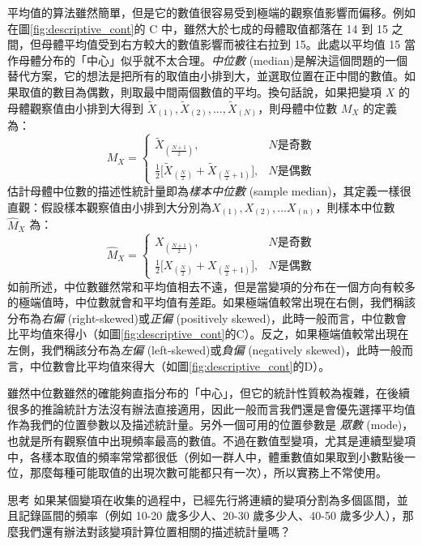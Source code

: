     平均值的算法雖然簡單，但是它的數值很容易受到極端的觀察值影響而偏移。例如在圖\ref{fig:descriptive_cont}的 C 中，雖然大於七成的母體取值都落在 14 到 15 之間，但母體平均值受到右方較大的數值影響而被往右拉到 15。此處以平均值 15 當作母體分布的「中心」似乎就不太合理。\textit{中位數} (median)是解決這個問題的一個替代方案，它的想法是把所有的取值由小排到大，並選取位置在正中間的數值。如果取值的數目為偶數，則取最中間兩個數值的平均。換句話說，如果把變項 $X$ 的母體觀察值由小排到大得到 $\tilde{X}_{(1)}, \tilde{X}_{(2)}, ..., \tilde{X}_{(N)}$，則母體中位數 $M_X$ 的定義為：
    \[M_X = \left\{\begin{array}{lr}
        \tilde{X}_{(\frac{N+1}{2})}, & N \text{是奇數}\\
        \frac{1}{2}\Big[\tilde{X}_{(\frac{N}{2})}+\tilde{X}_{(\frac{N}{2}+1)}\Big], & N \text{是偶數}
    \end{array}\right.\]
    估計母體中位數的描述性統計量即為\textit{樣本中位數} (sample median)，其定義一樣很直觀：假設樣本觀察值由小排到大分別為$X_{(1)}, X_{(2)}, ... X_{(n)}$，則樣本中位數 $\hat{M}_X$ 為：
    \[\hat{M}_X = \left\{\begin{array}{lr}
        X_{(\frac{N+1}{2})}, & N \text{是奇數}\\
        \frac{1}{2}\Big[X_{(\frac{N}{2})}+X_{(\frac{N}{2}+1)}\Big], & N \text{是偶數}
    \end{array}\right.\]
    如前所述，中位數雖然常和平均值相去不遠，但是當變項的分布在一個方向有較多的極端值時，中位數就會和平均值有差距。如果極端值較常出現在右側，我們稱該分布為\textit{右偏} (right-skewed)或\textit{正偏} (positively skewed)，此時一般而言，中位數會比平均值來得小（如圖\ref{fig:descriptive_cont}的C）。反之，如果極端值較常出現在左側，我們稱該分布為\textit{左偏} (left-skewed)或\textit{負偏} (negatively skewed)，此時一般而言，中位數會比平均值來得大（如圖\ref{fig:descriptive_cont}的D）。
    
    雖然中位數雖然的確能夠直指分布的「中心」，但它的統計性質較為複雜，在後續很多的推論統計方法沒有辦法直接適用，因此一般而言我們還是會優先選擇平均值作為我們的位置參數以及描述統計量。另外一個可用的位置參數是 \textit{眾數} (mode)，也就是所有觀察值中出現頻率最高的數值。不過在數值型變項，尤其是連續型變項中，各樣本取值的頻率常常都很低（例如一群人中，體重數值如果取到小數點後一位，那麼每種可能取值的出現次數可能都只有一次），所以實務上不常使用。

    \begin{custom}{思考}
        如果某個變項在收集的過程中，已經先行將連續的變項分割為多個區間，並且記錄區間的頻率（例如 10-20 歲多少人、20-30 歲多少人、40-50 歲多少人），那麼我們還有辦法對該變項計算位置相關的描述統計量嗎？
    \end{custom}

